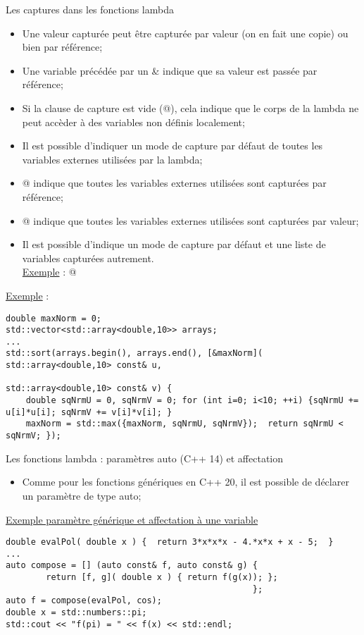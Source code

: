 \documentclass[compress,10pt,aspectratio=169]{beamer}
\begin{document}
\begin{frame}[fragile]{Les captures dans les fonctions lambda}
\scriptsize

\begin{itemize}
\item Une valeur capturée peut être capturée par valeur (on en fait une copie) ou bien par référence;
\item Une variable précédée par un \& indique que sa valeur est passée par référence;
\item Si la clause de capture est vide (\verb@[]@), cela indique que le corps de la lambda ne peut accèder à des variables non définis localement;
\item Il est possible d'indiquer un mode de capture par défaut de toutes les variables externes utilisées par la lambda;
\item \verb@[&]@ indique que toutes les variables externes utilisées sont capturées par référence;
\item \verb@[=]@ indique que toutes les variables externes utilisées sont capturées par valeur;
\item Il est possible d'indique un mode de capture par défaut et une liste de variables capturées autrement.\\
\underline{Exemple} : \verb@[=,&total]@
\end{itemize}

\underline{Exemple} :
\begin{verbatim}
double maxNorm = 0;
std::vector<std::array<double,10>> arrays;
... 
std::sort(arrays.begin(), arrays.end(), [&maxNorm]( std::array<double,10> const& u, 
                                                    std::array<double,10> const& v) {
    double sqNrmU = 0, sqNrmV = 0; for (int i=0; i<10; ++i) {sqNrmU += u[i]*u[i]; sqNrmV += v[i]*v[i]; }
    maxNorm = std::max({maxNorm, sqNrmU, sqNrmV});  return sqNrmU < sqNrmV; });
\end{verbatim}
\end{frame}

\begin{frame}[fragile]{Les fonctions lambda : paramètres auto (C++ 14) et affectation}
  \scriptsize 

\begin{itemize}
\item Comme pour les fonctions génériques en C++ 20, il est possible de déclarer un paramètre de type auto;
\end{itemize}

\underline{Exemple paramètre générique et affectation à une variable}
\begin{verbatim}
double evalPol( double x ) {  return 3*x*x*x - 4.*x*x + x - 5;  }
...
auto compose = [] (auto const& f, auto const& g) {
        return [f, g]( double x ) { return f(g(x)); };
                                                 };
auto f = compose(evalPol, cos);
double x = std::numbers::pi;
std::cout << "f(pi) = " << f(x) << std::endl;
\end{verbatim}
\end{frame}
\end{document}
